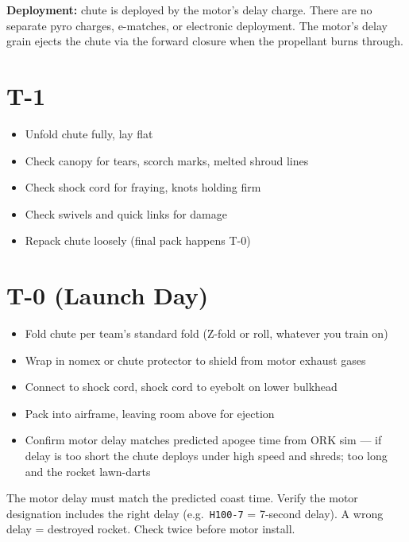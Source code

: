 \documentclass[11pt,a4paper,oneside]{report}
\begin{document}
\begin{infobox}
\textbf{Deployment:} chute is deployed by the motor's delay charge. There are no separate pyro charges, e-matches, or electronic deployment. The motor's delay grain ejects the chute via the forward closure when the propellant burns through.
\end{infobox}

\section{T-1}

\begin{itemize}
  \item Unfold chute fully, lay flat
  \item Check canopy for tears, scorch marks, melted shroud lines
  \item Check shock cord for fraying, knots holding firm
  \item Check swivels and quick links for damage
  \item Repack chute loosely (final pack happens T-0)
\end{itemize}

\section{T-0 (Launch Day)}

\begin{itemize}
  \item Fold chute per team's standard fold (Z-fold or roll, whatever you train on)
  \item Wrap in nomex or chute protector to shield from motor exhaust gases
  \item Connect to shock cord, shock cord to eyebolt on lower bulkhead
  \item Pack into airframe, leaving room above for ejection
  \item Confirm motor delay matches predicted apogee time from ORK sim --- if delay is too short the chute deploys under high speed and shreds; too long and the rocket lawn-darts
\end{itemize}

\begin{warnbox}
The motor delay must match the predicted coast time. Verify the motor designation includes the right delay (e.g.\ \texttt{H100-7} = 7-second delay). A wrong delay = destroyed rocket. Check twice before motor install.
\end{warnbox}
\end{document}
